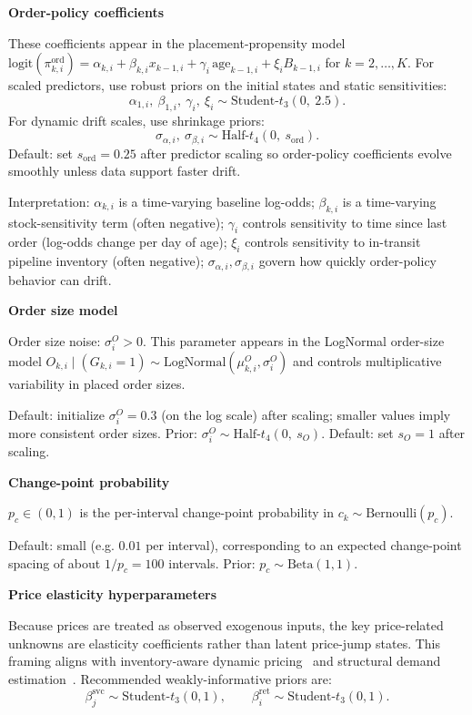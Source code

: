 \documentclass[11pt]{article}
\begin{document}
\textbf{Order-policy coefficients}

These coefficients appear in the placement-propensity model
$\text{logit}(\pi^{\mathrm{ord}}_{k,i}) = \alpha_{k,i} + \beta_{k,i}x_{k-1,i} + \gamma_i\,\text{age}_{k-1,i} + \xi_i B_{k-1,i}$ for $k=2,\dots,K$.
For scaled predictors, use robust priors on the initial states and static sensitivities:
\[
  \alpha_{1,i},\ \beta_{1,i},\ \gamma_i,\ \xi_i \sim \text{Student-}t_{3}(0,\ 2.5).
\]
For dynamic drift scales, use shrinkage priors:
\[
  \sigma_{\alpha,i},\ \sigma_{\beta,i} \sim \text{Half-}t_4(0,\ s_{\text{ord}}).
\]
Default: set $s_{\text{ord}}=0.25$ after predictor scaling so order-policy coefficients evolve smoothly unless data support faster drift.

Interpretation: $\alpha_{k,i}$ is a time-varying baseline log-odds; $\beta_{k,i}$ is a time-varying stock-sensitivity term (often negative); $\gamma_i$ controls sensitivity to time since last order (log-odds change per day of age); $\xi_i$ controls sensitivity to in-transit pipeline inventory (often negative); $\sigma_{\alpha,i},\sigma_{\beta,i}$ govern how quickly order-policy behavior can drift.

\textbf{Order size model}

Order size noise: $\sigma^{O}_i > 0$.
This parameter appears in the LogNormal order-size model
$O_{k,i}\mid(G_{k,i}=1)\sim\text{LogNormal}(\mu^O_{k,i},\sigma^O_i)$ and controls multiplicative variability in placed order sizes.

Default: initialize $\sigma^{O}_i=0.3$ (on the log scale) after scaling; smaller values imply more consistent order sizes.
Prior: $\sigma^{O}_i \sim \text{Half-}t_{4}(0,\ s_O)$.
Default: set $s_O=1$ after scaling.

\textbf{Change-point probability}

$p_c \in (0,1)$ is the per-interval change-point probability in
$c_k\sim\text{Bernoulli}(p_c)$.

Default: small (e.g. $0.01$ per interval), corresponding to an expected change-point spacing of about $1/p_c=100$ intervals.
Prior: $p_c \sim \text{Beta}(1,1)$.

\textbf{Price elasticity hyperparameters}

Because prices are treated as observed exogenous inputs, the key price-related unknowns are elasticity coefficients rather than latent price-jump states.
This framing aligns with inventory-aware dynamic pricing~\cite{GallegoVanRyzin1994} and structural demand estimation~\cite{BerryLevinsohnPakes1995,Train2009}.
Recommended weakly-informative priors are:
\[
  \beta^{\mathrm{svc}}_j \sim \text{Student-}t_3(0,1),\qquad
  \beta^{\mathrm{ret}}_i \sim \text{Student-}t_3(0,1).
\]
\end{document}
